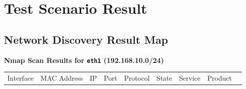 \section{Test Scenario Result}\label{test-scenario-result}

\subsection{Network Discovery Result
Map}\label{network-discovery-result-map}

\textbf{Nmap Scan Results for \texttt{eth1} (192.168.10.0/24)}

\begin{longtable}[]{@{}
  >{\raggedright\arraybackslash}p{}
  >{\raggedright\arraybackslash}p{}
  >{\raggedright\arraybackslash}p{}
  >{\raggedleft\arraybackslash}p{}
  >{\raggedright\arraybackslash}p{}
  >{\raggedright\arraybackslash}p{}
  >{\raggedright\arraybackslash}p{}
  >{\raggedright\arraybackslash}p{}
  >{\raggedright\arraybackslash}p{}@{}}
\toprule\noalign{}
\begin{minipage}[b]{\linewidth}\raggedright
Interface
\end{minipage} & \begin{minipage}[b]{\linewidth}\raggedright
MAC Address
\end{minipage} & \begin{minipage}[b]{\linewidth}\raggedright
IP
\end{minipage} & \begin{minipage}[b]{\linewidth}\raggedleft
Port
\end{minipage} & \begin{minipage}[b]{\linewidth}\raggedright
Protocol
\end{minipage} & \begin{minipage}[b]{\linewidth}\raggedright
State
\end{minipage} & \begin{minipage}[b]{\linewidth}\raggedright
Service
\end{minipage} & \begin{minipage}[b]{\linewidth}\raggedright
Product
\end{minipage} & \begin{minipage}[b]{\linewidth}\raggedright

\end{minipage}
\end{longtable}
